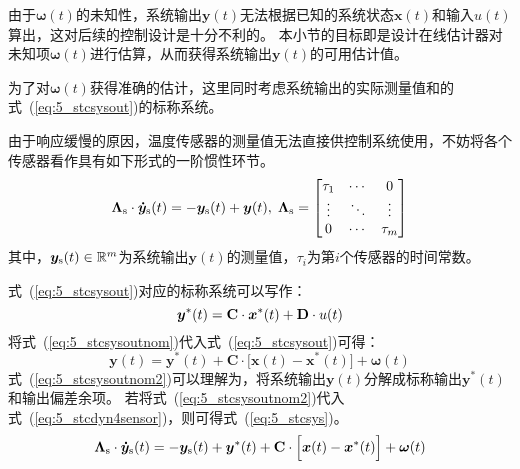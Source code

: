 \documentclass{article}
\begin{document}
由于$\bm{\omega}(t)$的未知性，系统输出$\bm{y}(t)$无法根据已知的系统状态$\bm{x}(t)$和输入$u(t)$算出，这对后续的控制设计是十分不利的。
本小节的目标即是设计在线估计器对未知项$\bm{\omega}(t)$进行估算，从而获得系统输出$\bm{y}(t)$的可用估计值。

为了对$\bm{\omega}(t)$获得准确的估计，这里同时考虑系统输出的实际测量值和的式~(\ref{eq:5_stcsysout})的标称系统。

由于响应缓慢的原因，温度传感器的测量值无法直接供控制系统使用，不妨将各个传感器看作具有如下形式的一阶惯性环节。
\begin{equation}
   \bm{\Lambda}_{\rm{s}} \cdot \bm{\dot y}_{\rm{s}}(t)=-\bm{y}_{\rm{s}}(t)+\bm{y}(t), \;
\bm{\Lambda}_{\rm{s}} = \begin{bmatrix}
\tau_1 & \cdots  & 0 \\
 \vdots & \ddots  & \vdots \\
 0 & \cdots & \tau_m
\end{bmatrix}
\label{eq:5_stcdyn4sensor}
\end{equation}
其中，$\bm{y}_{\rm{s}}(t)\in\mathbb{R}^{m}$为系统输出$\bm{y}(t)$的测量值，$\tau_i$为第$i$个传感器的时间常数。

式~(\ref{eq:5_stcsysout})对应的标称系统可以写作：
\begin{equation}
    \bm{y}^{*}(t)=\mathbf{C}\cdot \bm{x}^{*}(t)+\mathbf{D}\cdot u(t)\\
\label{eq:5_stcsysoutnom}
\end{equation}
将式~(\ref{eq:5_stcsysoutnom})代入式~(\ref{eq:5_stcsysout})可得：
\begin{equation}
   \bm{y}(t)=\bm{y}^{*}(t)+\mathbf{C}\cdot \Big [ \bm{x}(t)-\bm{x}^{*}(t) \Big ]+\bm{\omega}(t)
\label{eq:5_stcsysoutnom2}
\end{equation}
式~(\ref{eq:5_stcsysoutnom2})可以理解为，将系统输出$\bm{y}(t)$分解成标称输出$\bm{y}^{*}(t)$和输出偏差余项。
若将式~(\ref{eq:5_stcsysoutnom2})代入式~(\ref{eq:5_stcdyn4sensor})，则可得式~(\ref{eq:5_stcsys})。
\begin{equation}
      \bm{\Lambda}_{\rm{s}} \cdot \bm{\dot y}_{\rm{s}}(t)=-\bm{y}_{\rm{s}}(t)+\bm{y}^{*}(t)+\mathbf{C}\cdot \Big [ \bm{x}(t)-\bm{x}^{*}(t) \Big ]+\bm{\omega}(t)
\label{eq:5_stcsys}
\end{equation}
\end{document}
